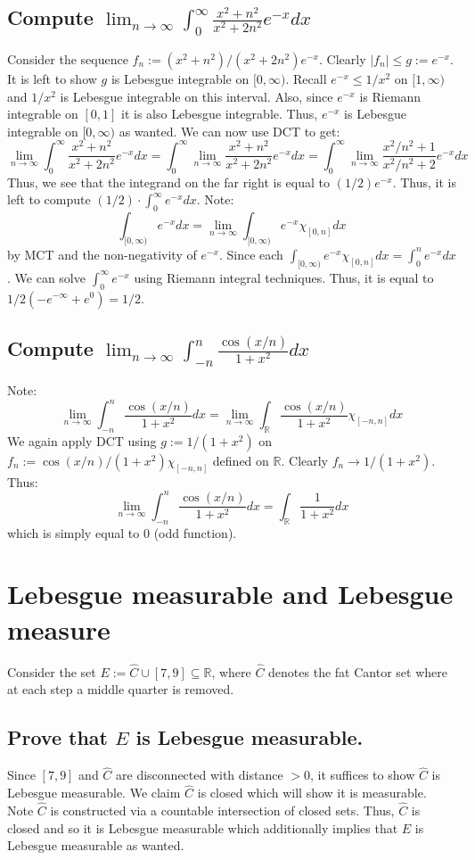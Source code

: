 \documentclass[11pt]{amsart}
\newcommand{\R}{\mathbb{R}}  %
\begin{document}
\subsection*{Compute $\lim_{n\to\infty} \int_0^{\infty} \frac{x^2+n^2}{x^2+2n^2}e^{-x}dx$} Consider the sequence $f_n := (x^2+n^2)/(x^2+2n^2)e^{-x}$. Clearly $|f_n|\leq g := e^{-x}$.
It is left to show $g$ is Lebesgue integrable on $[0,\infty)$. Recall $e^{-x} \leq 1/x^2$ on $[1,\infty)$ and $1/x^2$ is Lebesgue integrable on this interval. Also, since $e^{-x}$ is Riemann
integrable on $[0,1]$ it is also Lebesgue integrable. Thus, $e^{-x}$ is Lebesgue integrable on $[0,\infty)$ as wanted.  We can now use DCT to get:
\[ \lim_{n\to\infty} \int_0^{\infty} \frac{x^2+n^2}{x^2+2n^2}e^{-x}dx = \int_0^{\infty} \lim_{n\to\infty} \frac{x^2+n^2}{x^2+2n^2}e^{-x}dx = \int_0^{\infty} \lim_{n\to\infty} 
	\frac{x^2/n^2+1}{x^2/n^2+2}e^{-x}dx\]
Thus, we see that the integrand on the far right is equal to $(1/2)e^{-x}$. Thus, it is left to compute $(1/2) \cdot \int_0^{\infty} e^{-x}dx$. Note:
\[ \int_{[0,\infty)} e^{-x}dx = \lim_{n\to\infty} \int_{[0,\infty)} e^{-x}\chi_{[0,n]}dx \]
by MCT and the non-negativity of $e^{-x}$. Since each $\int_{[0,\infty)} e^{-x}\chi_{[0,n]}dx = \int_0^n e^{-x}dx$. We can solve $\int_0^{\infty} e^{-x}$ using Riemann integral techniques.
Thus, it is equal to $1/2 ( -e^{-\infty} + e^0 ) = 1/2$.

\subsection*{Compute $\lim_{n\to\infty} \int_{-n}^n \frac{\cos(x/n)}{1+x^2}dx$} Note:
\[ \lim_{n\to\infty} \int_{-n}^n \frac{\cos(x/n)}{1+x^2}dx = \lim_{n\to\infty} \int_{\R} \frac{\cos(x/n)}{1+x^2}\chi_{[-n,n]}dx \]
We again apply DCT using $g := 1/(1+x^2)$ on $f_n := \cos(x/n)/(1+x^2)\chi_{[-n,n]}$ defined on $\R$. Clearly $f_n \to 1/(1+x^2)$.  Thus:
\[ \lim_{n\to\infty} \int_{-n}^n \frac{\cos(x/n)}{1+x^2}dx = \int_{\R} \frac{1}{1+x^2}dx \]
which is simply equal to $0$ (odd function).

\section{Lebesgue measurable and Lebesgue measure}
Consider the set $E := \hat{C}\cup [7,9] \subseteq \mathbb{R}$, where $\hat{C}$ denotes the fat Cantor set where at each step a middle quarter is removed.

\subsection*{Prove that $E$ is Lebesgue measurable.} Since $[7,9]$ and $\hat{C}$ are disconnected with distance $>0$, it suffices to show $\hat{C}$ is Lebesgue measurable.
We claim $\hat{C}$ is closed which will show it is measurable. Note $\hat{C}$ is constructed via a countable intersection of closed sets. Thus, $\hat{C}$ is closed and so
it is Lebesgue measurable which additionally implies that $E$ is Lebesgue measurable as wanted.
\end{document}
